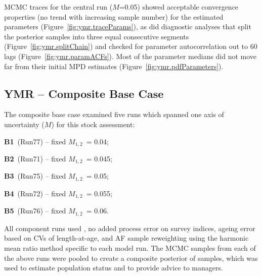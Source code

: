 \documentclass[11pt]{book}
\begin{document}
MCMC traces for the central run ($M$=0.05) showed acceptable convergence properties (no trend with increasing sample number) for the estimated parameters (Figure~\ref{fig:ymr.traceParams}), as did diagnostic analyses that split the posterior samples into three equal consecutive segments (Figure~\ref{fig:ymr.splitChain}) and checked for parameter autocorrelation out to 60 lags (Figure~\ref{fig:ymr.paramACFs}).
Most of the parameter medians did not move far from their initial MPD estimates (Figure~\ref{fig:ymr.pdfParameters}).

\graphicspath{{C:/Users/haighr/Files/GFish/PSARC/PSARC_2020s/PSARC21/YMR/Data/SS/YMR2021/Run75/MCMC.75.01.nuts4K/english/}}

\subsection{YMR -- Composite Base Case}


The composite base case examined five runs which spanned one axis of uncertainty ($M$) for this stock assessment:
\begin{itemize_csas}{}{}
\item \textbf{B1}~(Run77) -- fixed $M_{1,2}$~= 0.04;
\item \textbf{B2}~(Run71) -- fixed $M_{1,2}$~= 0.045;
\item \textbf{B3}~(Run75) -- fixed $M_{1,2}$~= 0.05;
\item \textbf{B4}~(Run72) -- fixed $M_{1,2}$~= 0.055;
\item \textbf{B5}~(Run76) -- fixed $M_{1,2}$~= 0.06.
\end{itemize_csas}

All component runs used , no added process error on survey indices, ageing error based on CVs of length-at-age, and AF sample reweighting using the harmonic mean ratio method specific to each model run.
The \Nmcmc{} MCMC samples from each of the above runs were pooled to create a composite posterior of \Nbase{} samples, which was used to estimate population status and to provide advice to managers.
\end{document}
